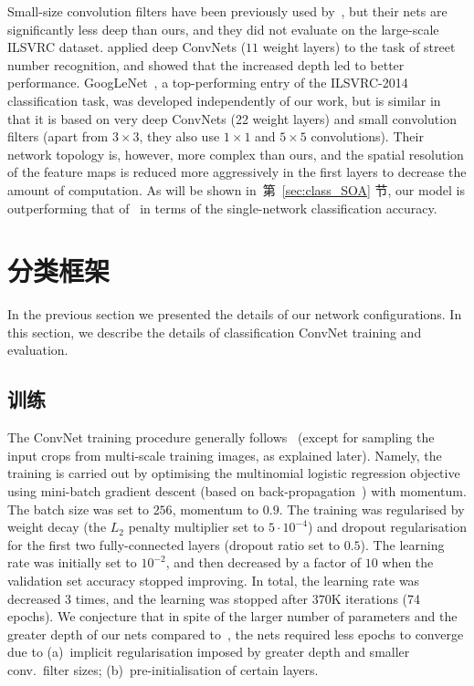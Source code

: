 \documentclass{article} %
\newcommand{\sref}[1]{第~\ref{#1} 节}
\begin{document}
Small-size convolution filters have been previously used by~\citet{Ciresan11}, but their nets are significantly less deep than ours, and they did not
evaluate on the large-scale ILSVRC dataset. 
\citet{Goodfellow13} applied deep ConvNets ($11$ weight layers) to the task of street number recognition, and showed that the increased depth led to better performance.
GoogLeNet~\citep{Szegedy14}, a top-performing entry of the ILSVRC-2014 classification task, was developed independently of our work, but is similar in that it is based on very deep ConvNets (22 weight layers) and small convolution filters (apart from $3\times 3$, they also use $1\times 1$ and \mbox{$5\times 5$} convolutions). Their network topology is, however, more complex than ours, and the spatial resolution of the feature maps is reduced more aggressively in the first layers to decrease the amount of computation. As will be shown in~\sref{sec:class_SOA}, our model is outperforming that of~\citet{Szegedy14} in terms of the single-network classification accuracy.

\section{分类框架}
\label{sec:learning}
In the previous section we presented the details of our network configurations. In this section, we describe the details of classification ConvNet training and evaluation.

\subsection{训练}
\label{sec:train}
The ConvNet training procedure generally follows~\citet{Krizhevsky12} (except for sampling the input crops from multi-scale training images, as explained later).
Namely, the training is carried out by optimising the multinomial logistic regression objective using mini-batch gradient descent (based on back-propagation~\citep{LeCun89}) with momentum. The batch size was set to $256$, momentum to $0.9$.
The training was regularised by weight decay (the $L_2$ penalty multiplier set to $5\cdot 10^{-4}$) and dropout regularisation for the first two fully-connected layers (dropout ratio set to $0.5$).
The learning rate was initially set to $10^{-2}$, and then decreased
by a factor of $10$ when the validation set accuracy stopped improving. In total, the learning rate was decreased 3 times, and the learning was stopped after $370$K iterations
(74 epochs). We conjecture that in spite of the larger number of parameters and the greater depth of our nets compared to~\citep{Krizhevsky12}, the nets required less epochs
to converge due to (a)~implicit regularisation imposed by greater depth and smaller conv.\ filter sizes; (b)~pre-initialisation of certain layers.
\end{document}
